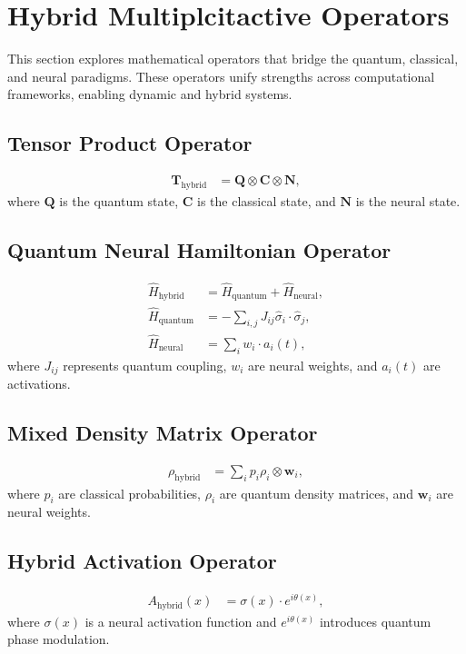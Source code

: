 \documentclass{article}
\theoremstyle{plain}
\begin{document}
\section{Hybrid Multiplcitactive Operators}
This section explores mathematical operators that bridge the quantum, classical, and neural paradigms. These operators unify strengths across computational frameworks, enabling dynamic and hybrid systems.
\begin{enumerate}
\subsection{Tensor Product Operator}
    \begin{align*}
        \mathbf{T}_{\text{hybrid}} &= \mathbf{Q} \otimes \mathbf{C} \otimes \mathbf{N},
    \end{align*}
    where $\mathbf{Q}$ is the quantum state, $\mathbf{C}$ is the classical state, and $\mathbf{N}$ is the neural state.

   \subsection{Quantum Neural Hamiltonian Operator}
    \begin{align*}
        \hat{H}_{\text{hybrid}} &= \hat{H}_{\text{quantum}} + \hat{H}_{\text{neural}}, \\
        \hat{H}_{\text{quantum}} &= -\sum_{i,j} J_{ij} \hat{\sigma}_i \cdot \hat{\sigma}_j, \\
        \hat{H}_{\text{neural}} &= \sum_i w_i \cdot a_i(t),
    \end{align*}
    where $J_{ij}$ represents quantum coupling, $w_i$ are neural weights, and $a_i(t)$ are activations.

    \subsection{Mixed Density Matrix Operator}
    \begin{align*}
        \rho_{\text{hybrid}} &= \sum_i p_i \rho_i \otimes \mathbf{w}_i,
    \end{align*}
    where $p_i$ are classical probabilities, $\rho_i$ are quantum density matrices, and $\mathbf{w}_i$ are neural weights.

    \subsection{Hybrid Activation Operator}
    \begin{align*}
        A_{\text{hybrid}}(x) &= \sigma(x) \cdot e^{i\theta(x)},
    \end{align*}
    where $\sigma(x)$ is a neural activation function and $e^{i\theta(x)}$ introduces quantum phase modulation.
\end{enumerate}
\end{document}
